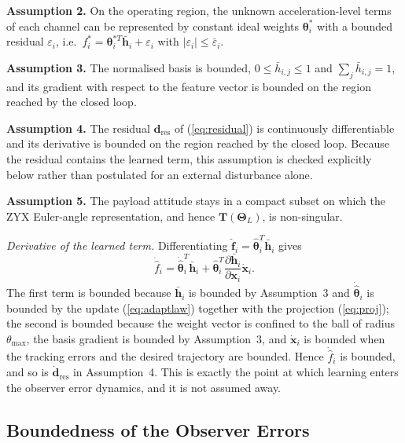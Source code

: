 \documentclass[Review,sageh,times]{sagej}
\begin{document}
\noindent\textbf{Assumption 2.} On the operating region, the unknown
acceleration-level terms of each channel can be represented by constant
ideal weights $\boldsymbol{\theta}_i^{*}$ with a bounded residual
$\varepsilon_i$, i.e.\ $f_i^{*}=\boldsymbol{\theta}_i^{*T}\bar{\mathbf{h}}_i+\varepsilon_i$ with
$|\varepsilon_i|\le\bar\varepsilon_i$.

\noindent\textbf{Assumption 3.} The normalised basis is bounded,
$0\le\bar h_{i,j}\le1$ and $\sum_j\bar h_{i,j}=1$, and its gradient with respect to
the feature vector is bounded on the region reached by the closed loop.

\noindent\textbf{Assumption 4.} The residual $\mathbf{d}_{\mathrm{res}}$ of (\ref{eq:residual}) is
continuously differentiable and its derivative is bounded on the region
reached by the closed loop. Because the residual contains the learned term,
this assumption is checked explicitly below rather than postulated for an
external disturbance alone.

\noindent\textbf{Assumption 5.} The payload attitude stays in a compact subset on
which the ZYX Euler-angle representation, and hence $\mathbf{T}(\boldsymbol{\Theta}_L)$, is
non-singular.
\medskip

\emph{Derivative of the learned term.} Differentiating
$\hat{\mathbf{f}}_i=\hat{\boldsymbol{\theta}}_i^{T}\bar{\mathbf{h}}_i$ gives
\begin{equation}
\dot{\hat{f}}_i = \dot{\hat{\boldsymbol{\theta}}}_i^{T}\bar{\mathbf{h}}_i
+ \hat{\boldsymbol{\theta}}_i^{T}\frac{\partial\bar{\mathbf{h}}_i}{\partial\mathbf{x}_i}\dot{\mathbf{x}}_i .
\label{eq:dfhat}
\end{equation}
The first term is bounded because $\bar{\mathbf{h}}_i$ is bounded by Assumption~3
and $\dot{\hat{\boldsymbol{\theta}}}_i$ is bounded by the update (\ref{eq:adaptlaw}) together with the
projection (\ref{eq:proj}); the second is bounded because the weight vector is confined
to the ball of radius $\theta_{\max}$, the basis gradient is bounded by
Assumption~3, and $\dot{\mathbf{x}}_i$ is bounded when the tracking errors and the
desired trajectory are bounded. Hence $\dot{\hat{f}}_i$ is bounded, and so is
$\dot{\mathbf{d}}_{\mathrm{res}}$ in Assumption~4. This is exactly the point at which
learning enters the observer error dynamics, and it is not assumed away.

\subsection*{Boundedness of the Observer Errors}
\end{document}
